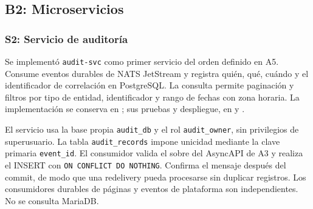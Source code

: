 \clearpage
\subsection{B2: Microservicios}
\label{sec:fase6-b2}
\subsubsection{S2: Servicio de auditoría}
\label{sec:b2-auditoria}

Se implementó \texttt{audit-svc} como primer servicio del orden definido
en A5. Consume eventos durables de NATS JetStream y registra quién,
qué, cuándo y el identificador de correlación en PostgreSQL. La consulta
 permite paginación y filtros por tipo de entidad,
identificador y rango de fechas con zona horaria. La implementación se
conserva en ; sus pruebas y despliegue, en
 y .

El servicio usa la base propia \texttt{audit\_db} y el rol
\texttt{audit\_owner}, sin privilegios de superusuario. La tabla
\texttt{audit\_records} impone unicidad mediante la clave primaria
\texttt{event\_id}. El consumidor valida el sobre del AsyncAPI de A3 y
realiza el INSERT con \texttt{ON CONFLICT DO NOTHING}. Confirma el mensaje
después del commit, de modo que una redelivery pueda procesarse sin
duplicar registros. Los consumidores durables de páginas y eventos de
plataforma son independientes. No se consulta MariaDB.

